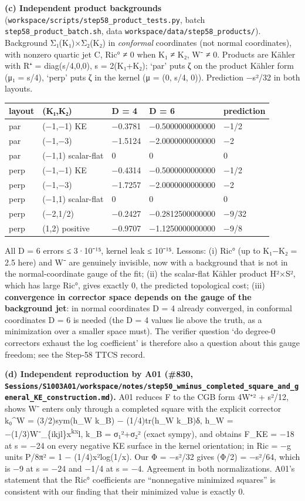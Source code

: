 \documentclass[
  10pt,
]{report}
\begin{document}
\textbf{(c) Independent product backgrounds}
(\texttt{workspace/scripts/step58\_product\_tests.py}, batch
\texttt{step58\_product\_batch.sh}, data
\texttt{workspace/data/step58\_products/}). Background Σ₁(K₁)×Σ₂(K₂) in
\emph{conformal} coordinates (not normal coordinates), with nonzero
quartic jet C, Ric° ≠ 0 when K₁ ≠ K₂, W⁻ ≠ 0. Products are Kähler with
R⁺ = diag(s/4,0,0), s = 2(K₁+K₂); `par' puts ζ on the product Kähler
form (μ₁ = s/4), `perp' puts ζ in the kernel (μ = (0, s/4, 0)).
Prediction −s²/32 in both layouts.

\begin{longtable}[]{@{}lllll@{}}
\toprule
layout & (K₁,K₂) & D = 4 & D = 6 & prediction\tabularnewline
\midrule
\endhead
par & (−1,−1) KE & −0.3781 & −0.5000000000000 & −1/2\tabularnewline
par & (−1,−3) & −1.5124 & −2.0000000000000 & −2\tabularnewline
par & (−1,1) scalar-flat & 0 & 0 & 0\tabularnewline
perp & (−1,−1) KE & −0.4314 & −0.5000000000000 & −1/2\tabularnewline
perp & (−1,−3) & −1.7257 & −2.0000000000000 & −2\tabularnewline
perp & (−1,1) scalar-flat & 0 & 0 & 0\tabularnewline
perp & (−2,1/2) & −0.2427 & −0.2812500000000 & −9/32\tabularnewline
perp & (1,2) positive & −0.9707 & −1.1250000000000 & −9/8\tabularnewline
\bottomrule
\end{longtable}

All D = 6 errors ≤ 3·10⁻¹⁵, kernel leak ≤ 10⁻¹⁵. Lessons: (i) Ric° (up
to \textbar K₁−K₂\textbar{} = 2.5 here) and W⁻ are genuinely invisible,
now with a background that is not in the normal-coordinate gauge of the
fit; (ii) the scalar-flat Kähler product H²×S², which has large Ric°,
gives exactly 0, the predicted topological cost; (iii)
\textbf{convergence in corrector space depends on the gauge of the
background jet}: in normal coordinates D = 4 already converged, in
conformal coordinates D = 6 is needed (the D = 4 values lie above the
truth, as a minimization over a smaller space must). The verifier
question `do degree-0 correctors exhaust the log coefficient' is
therefore also a question about this gauge freedom; see the Step-58 TTCS
record.

\textbf{(d) Independent reproduction by A01 (\#830,
\texttt{Sessions/S1003A01/workspace/notes/step50\_wminus\_completed\_square\_and\_general\_KE\_construction.md}).}
A01 reduces F to the CGB form 4\textbar W⁺\textbar² + s²/12, shows W⁻
enters only through a completed square with the explicit corrector
k₀\^{}W = (3/2)sym(h\_W k\_B) − (1/4)tr(h\_W k\_B)δ, h\_W =
−(1/3)W⁻\_\{ikjl\}x\textsuperscript{kx}l, k\_B = σ₁²+σ₂² (exact sympy),
and obtains F\_KE = −18 at s = −24 on every negative KE surface in the
kernel orientation; in Ric = −g units P/8π² = 1 − (1/4)x²log(1/x). Our Φ
= −s²/32 gives (Φ/2) = −s²/64, which is −9 at s = −24 and −1/4 at s =
−4. Agreement in both normalizations. A01's statement that the Ric°
coefficients are ``nonnegative minimized squares'' is consistent with
our finding that their minimized value is exactly 0.
\end{document}
